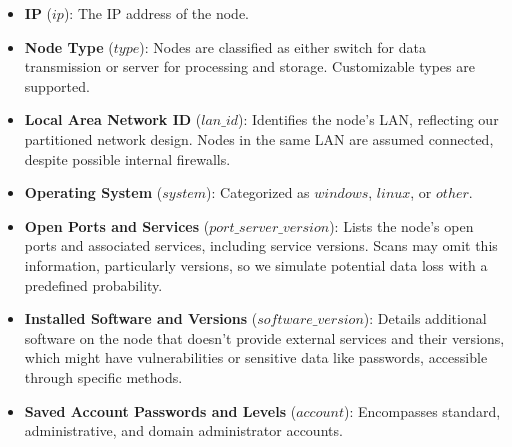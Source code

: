 \begin{itemize}
    \item \textbf{IP} ($ip$): The IP address of the node.
    \item \textbf{Node Type} ($type$): Nodes are classified as either switch for data transmission or server for processing and storage. Customizable types are supported.
    \item \textbf{Local Area Network ID} ($lan\_id$): Identifies the node's LAN, reflecting our partitioned network design. Nodes in the same LAN are assumed connected, despite possible internal firewalls.
    \item \textbf{Operating System} ($system$): Categorized as $windows$, $linux$, or $other$.
    \item \textbf{Open Ports and Services} ($port\_server\_version$): Lists the node’s open ports and associated services, including service versions. Scans may omit this information, particularly versions, so we simulate potential data loss with a predefined probability.
    \item \textbf{Installed Software and Versions} ($software\_version$): Details additional software on the node that doesn't provide external services and their versions, which might have vulnerabilities or sensitive data like passwords, accessible through specific methods.
    \item \textbf{Saved Account Passwords and Levels} ($account$): Encompasses standard, administrative, and domain administrator accounts.

\end{itemize}
